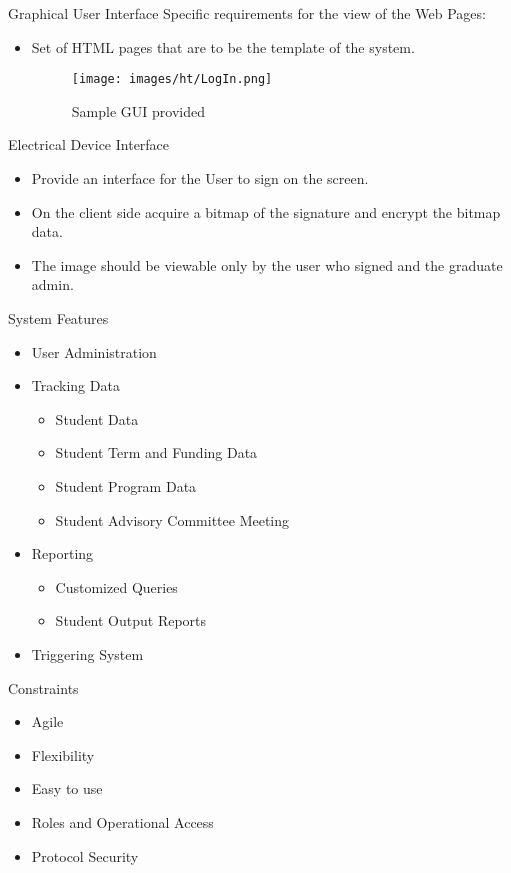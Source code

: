 \documentclass{beamer}
\begin{document}
\begin{frame}{Graphical User Interface}
Specific requirements for the view of the Web Pages:
\begin{itemize}
\item 
Set of HTML pages that are to be the template of the system.
\begin{figure}
\texttt{[image: images/ht/LogIn.png]} \caption{ Sample GUI provided }
\end{figure}
\end{itemize}
\end{frame}


\begin{frame}{Electrical Device Interface}
\begin{itemize}
\item
Provide an interface for the User to sign on the screen.
\item
On the client side acquire a bitmap of the signature and encrypt the bitmap data.
\item 
The image should be viewable only by the user who signed and the graduate admin.
\end{itemize}
\end{frame}

\begin{frame}{System Features}
\begin{itemize}
\item
User Administration
\item
Tracking Data
\begin{itemize}
\item
Student Data
\item
Student Term and Funding Data
\item 
Student Program Data
\item 
Student Advisory Committee Meeting 
\end{itemize}
\item 
Reporting
\begin{itemize}
\item
Customized Queries
\item 
Student Output Reports
\end{itemize}
\item
Triggering System 
\end{itemize}
\end{frame}

\begin{frame}{Constraints}
\begin{itemize}
\item Agile
\item Flexibility 
\item Easy to use
\item Roles and Operational Access
\item Protocol Security 
\end{itemize}
\end{frame}
\end{document}

